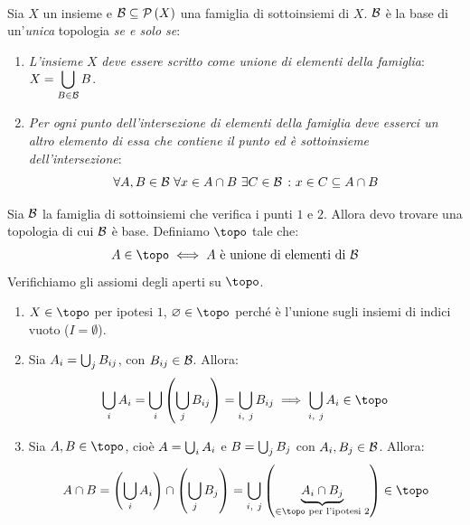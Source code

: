 \begin{theorema}~{}\label{teoremabasi}\\
Sia $X$ un insieme e $\mathcal{B}\subseteq\mathcal{P}\left(X\right)$ una famiglia di sottoinsiemi di $X$. $\mathcal{B}$ è la base di un'\textit{unica} topologia \textit{se e solo se}:
\begin{enumerate}
\item \textit{L'insieme} $X$ \textit{deve essere scritto come unione di elementi della famiglia}: $\displaystyle X=\mathop{{\bigcup}}\displaylimits_{B\in \mathcal{B}}B$.
\item \textit{Per ogni punto dell'intersezione di elementi della famiglia deve esserci un altro elemento di essa che contiene il punto ed è sottoinsieme dell'intersezione}:
\begin{equation}
	\forall A, B\in\basis\ \forall x\in A\cap B\ \exists C\in \basis\ \colon x\in C\subseteq A\cap B
\end{equation}
\end{enumerate}
\vspace{-6mm}
\end{theorema}
\begin{demonstration}
Sia $\mathcal{B}$ la famiglia di sottoinsiemi che verifica i punti $1$ e $2$. Allora devo trovare una topologia di cui $\mathcal{B}$ è base. Definiamo $\topo$ tale che:
\begin{equation*}
A\in\topo\iff A\text{ è unione di elementi di }\basis
\end{equation*}
Verifichiamo gli assiomi degli aperti su $\topo$.
\begin{enumerate}[label=\Roman*]
\item $X\in\topo$ per ipotesi $1$, $\emptyset\in\topo$ perché è l'unione sugli insiemi di indici vuoto ($I=\emptyset$).
\item Sia $A_i=\mathop{{\bigcup}}\displaylimits_{j}B_{ij}$, con $B_{ij}\in\mathcal{B}$. Allora:
\begin{equation*}
\union_{i}A_i=\union_{i}\left(\union_{j}B_{ij}\right)=\union_{i,\ j}B_{ij}\implies\union_{i,\ j}A_i\in\topo
\end{equation*}
\item Sia $A, B\in\topo$, cioè $A=\mathop{{\bigcup}}\displaylimits_{i}A_i$ e $B=\mathop{{\bigcup}}\displaylimits_{j}B_j$ con $A_i, B_j\in\mathcal{B}$. Allora:
\begin{equation*}
A\cap B=\left(\union_{i}A_i\right)\cap\left(\union_{j}B_j\right)=\union_{i,\ j}\left(\underbrace{A_i\cap B_j}_{\in\topo\text{ per l'ipotesi }2}\right)\in\topo 
\end{equation*}
\end{enumerate}
\vspace{-6mm}
\end{demonstration}
